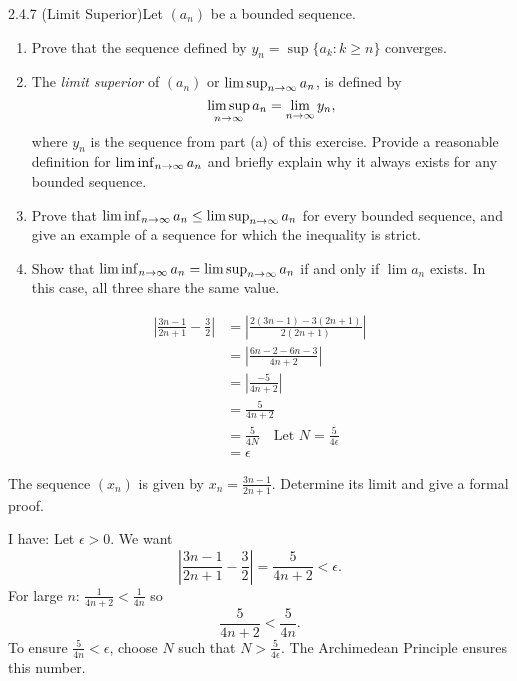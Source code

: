 \begin{exercise}
    {2.4.7 (Limit Superior)}Let \((a_{n})\) be a bounded sequence.
    \begin{enumerate}
        \item Prove that the sequence defined by \(y_{n} = \sup\{a_{k} \colon k \geq n\}\) converges.
        \item The \textit{limit superior} of \((a_{n})\) or \(\limsup_{n\rightarrow \infty}a_{n}\), is defined by \[
                  \limsup_{n\rightarrow \infty}a_{n} = \lim_{n \rightarrow \infty} y_{n},
              \]
              where \(y_{n}\) is the sequence from part (a) of this exercise. Provide a reasonable definition for \(\liminf_{n\rightarrow \infty}a_{n}\) and briefly explain why it always exists for any bounded sequence.
        \item Prove that \(\liminf_{n\rightarrow \infty}a_{n} \leq \limsup_{n\rightarrow \infty}a_{n}\) for every bounded sequence, and give an example of a sequence for which the inequality is strict.
        \item Show that \(\liminf_{n\rightarrow \infty}a_{n} = \limsup_{n\rightarrow \infty}a_{n}\) if and only if \(\lim a_{n}\) exists. In this case, all three share the same value.
    \end{enumerate}
\end{exercise}

\begin{align*}
    \left|\frac{3n - 1}{2n + 1} - \frac{3}{2}\right| & = \left|\frac{2(3n - 1) - 3(2n + 1)}{2(2n + 1)}\right|   \\
                                                     & = \left|\frac{6n - 2 - 6n - 3}{4n + 2}\right|            \\
                                                     & = \left|\frac{-5}{4n + 2}\right|                         \\
                                                     & = \frac{5}{4n + 2}                                       \\
                                                     & = \frac{5}{4N} \quad \text{Let } N = \frac{5}{4\epsilon} \\
                                                     & = \epsilon
\end{align*}

The sequence \((x_n)\) is given by \(x_n = \frac{3n - 1}{2n + 1}\). Determine its limit and give a formal proof.

I have:
Let \(\epsilon > 0\). We want
\[
    \left|\frac{3n - 1}{2n + 1} - \frac{3}{2}\right| = \frac{5}{4n + 2} < \epsilon.
\]
For large \(n\): \(\frac{1}{4n + 2} < \frac{1}{4n}\) so
\[
    \frac{5}{4n + 2} < \frac{5}{4n}.
\]
To ensure \(\frac{5}{4n} < \epsilon\), choose \(N\) such that \(N > \frac{5}{4\epsilon}\). The Archimedean Principle ensures this number.

